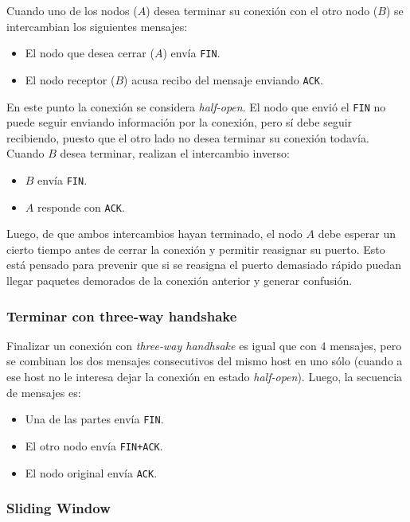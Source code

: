 \documentclass[]{article}
\begin{document}
Cuando uno de los nodos ($A$) desea terminar su conexión con el otro nodo ($B$) se intercambian los siguientes mensajes:
\begin{itemize}
    \item El nodo que desea cerrar ($A$) envía \texttt{FIN}.
    \item El nodo receptor ($B$) acusa recibo del mensaje enviando \texttt{ACK}.
\end{itemize}

En este punto la conexión se considera \emph{half-open}. El nodo que envió el \texttt{FIN} no puede seguir enviando información por la conexión, pero sí debe seguir recibiendo, puesto que el otro lado no desea terminar su conexión todavía. Cuando $B$ desea terminar, realizan el intercambio inverso:
\begin{itemize}
    \item $B$ envía \texttt{FIN}.
    \item $A$ responde con \texttt{ACK}.
\end{itemize}

Luego, de que ambos intercambios hayan terminado, el nodo $A$ debe esperar un cierto tiempo antes de cerrar la conexión y permitir reasignar su puerto. Esto está pensado para prevenir que si se reasigna el puerto demasiado rápido puedan llegar paquetes demorados de la conexión anterior y generar confusión.

\subsubsection{Terminar con three-way handshake}
Finalizar un conexión con \emph{three-way handhsake} es igual que con 4 mensajes, pero se combinan los dos mensajes consecutivos del mismo host en uno sólo (cuando a ese host no le interesa dejar la conexión en estado \emph{half-open}). Luego, la secuencia de mensajes es:
\begin{itemize}
    \item Una de las partes envía \texttt{FIN}.
    \item El otro nodo envía \texttt{FIN+ACK}.
    \item El nodo original envía \texttt{ACK}.
\end{itemize}


\subsubsection{Sliding Window}

\end{document}
